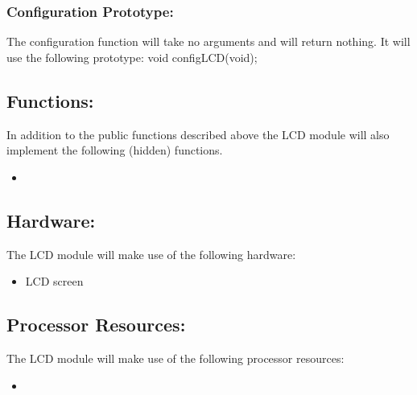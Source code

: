 \documentclass[]{article}
\begin{document}
\subsubsection{Configuration Prototype:}
The configuration function will take no arguments and will return nothing. It will use the following prototype: \newline \newline
void configLCD(void);

\subsection{Functions:}
In addition to the public functions described above the LCD module will also implement the following (hidden) functions.
\begin{itemize}
	\item 
\end{itemize}

\subsection{Hardware:}
The LCD module will make use of the following hardware:
\begin{itemize}
	\item LCD screen
\end{itemize}

\subsection{Processor Resources:}
The LCD module will make use of the following processor resources:
\begin{itemize}
	\item 
\end{itemize}
\end{document}
